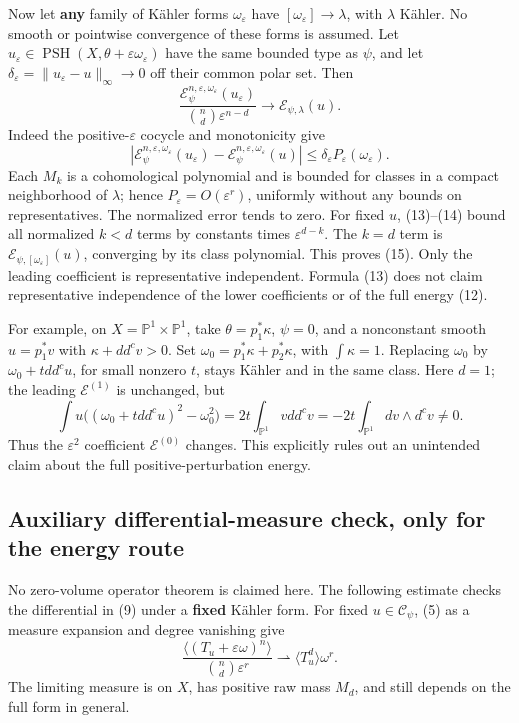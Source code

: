\documentclass[
  11pt,
]{article}
\begin{document}
Now let \textbf{any} family of Kähler forms \(\omega_\varepsilon\) have
\([\omega_\varepsilon]\to\lambda\), with \(\lambda\) Kähler. No smooth
or pointwise convergence of these forms is assumed. Let
\(u_\varepsilon\in\operatorname{PSH}(X,\theta+\varepsilon\omega_\varepsilon)\)
have the same bounded type as \(\psi\), and let
\(\delta_\varepsilon=\|u_\varepsilon-u\|_\infty\to0\) off their common
polar set. Then \[
\frac{\mathcal E^{n,\varepsilon,\omega_\varepsilon}_\psi(u_\varepsilon)}
{\binom n d\varepsilon^{n-d}}
\longrightarrow\mathcal E_{\psi,\lambda}(u).
\tag{15}
\] Indeed the positive-\(\varepsilon\) cocycle and monotonicity give \[
|\mathcal E^{n,\varepsilon,\omega_\varepsilon}_\psi(u_\varepsilon)
-\mathcal E^{n,\varepsilon,\omega_\varepsilon}_\psi(u)|
\leq\delta_\varepsilon P_\varepsilon(\omega_\varepsilon).
\] Each \(M_k\) is a cohomological polynomial and is bounded for classes
in a compact neighborhood of \(\lambda\); hence
\(P_\varepsilon=O(\varepsilon^r)\), uniformly without any bounds on
representatives. The normalized error tends to zero. For fixed \(u\),
(13)--(14) bound all normalized \(k<d\) terms by constants times
\(\varepsilon^{d-k}\). The \(k=d\) term is
\(\mathcal E_{\psi,[\omega_\varepsilon]}(u)\), converging by its class
polynomial. This proves (15). Only the leading coefficient is
representative independent. Formula (13) does not claim representative
independence of the lower coefficients or of the full energy (12).

For example, on \(X=\mathbb P^1\times\mathbb P^1\), take
\(\theta=p_1^*\kappa\), \(\psi=0\), and a nonconstant smooth
\(u=p_1^*v\) with \(\kappa+dd^cv>0\). Set
\(\omega_0=p_1^*\kappa+p_2^*\kappa\), with \(\int\kappa=1\). Replacing
\(\omega_0\) by \(\omega_0+tdd^cu\), for small nonzero \(t\), stays
Kähler and in the same class. Here \(d=1\); the leading
\(\mathcal E^{(1)}\) is unchanged, but \[
\int u\big((\omega_0+tdd^cu)^2-\omega_0^2\big)
=2t\int_{\mathbb P^1}vdd^cv
=-2t\int_{\mathbb P^1}dv\wedge d^cv\ne0.
\] Thus the \(\varepsilon^2\) coefficient \(\mathcal E^{(0)}\) changes.
This explicitly rules out an unintended claim about the full
positive-perturbation energy.

\subsection{Auxiliary differential-measure check, only for the energy
route}\label{auxiliary-differential-measure-check-only-for-the-energy-route}

No zero-volume operator theorem is claimed here. The following estimate
checks the differential in (9) under a \textbf{fixed} Kähler form. For
fixed \(u\in\mathcal C_\psi\), (5) as a measure expansion and degree
vanishing give \[
\frac{\langle(T_u+\varepsilon\omega)^n\rangle}
{\binom n d\varepsilon^r}
\rightharpoonup\langle T_u^d\rangle\omega^r.
\tag{16}
\] The limiting measure is on \(X\), has positive raw mass \(M_d\), and
still depends on the full form in general.
\end{document}
